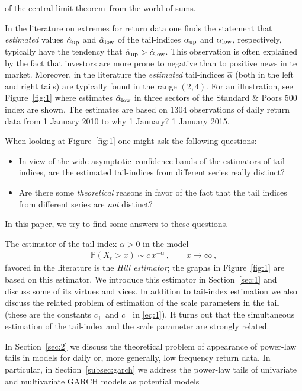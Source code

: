 \documentclass[11pt,a4]{amsart}
\newcommand{\red}{\color{darkred}}
\newcommand{\clt}{central limit theorem}
\newcommand{\asy}{asymptotic}
\newcommand{\fre}{frequenc}
\newcommand{\beao}{\begin{eqnarray*}}
\newcommand{\eeao}{\end{eqnarray*}\noindent}
\newcommand{\xto}{x\to\infty}
\renewcommand{\P }{{\mathbb P}}
\newcommand{\1}{{\mathbf 1}}
\begin{document}
of the \clt\ from the world of sums.
\par
In the literature on extremes for return data one finds the 
statement that {\em estimated} values $\hat \alpha_{\rm up}$ and $\hat \alpha_{\rm low}$ 
of the tail-indices $\alpha_{\rm up}$ and $\alpha_{\rm low}$,
respectively, typically have the tendency that $\hat \alpha_{\rm
  up}>\hat \alpha_{\rm low}$. 
This observation is often explained by the fact that investors are
more prone to negative than to positive news in te market. 
Moreover, in the literature the {\em estimated} tail-indices $\hat \alpha$ (both in the left and right tails) 
are typically found in the range $(2,4)$. For an illustration, see
Figure~\ref{fig:1} where estimates $\hat \alpha_{\rm low}$ 
in three sectors of the Standard \& Poors 500 index  are shown. The
estimates are based on 1304 observations of daily return 
data from 1 January 2010 to {\red why 1 January?} 1 January 2015.
\par
When looking at Figure~\ref{fig:1} one might ask the following questions:
\begin{itemize}
\item
In view of the wide \asy\ confidence bands of the estimators of tail-indices, 
are the estimated tail-indices from different series really distinct?
\item
Are there some {\em theoretical} reasons in favor of the fact that the tail indices from different series are {\em not} 
distinct?
\end{itemize}
In this paper, we try to find some answers to these questions. 
\par
The estimator of the tail-index $\alpha>0$  in the model
\beao
\P(X_t>x)\sim c\,x^{-\alpha}\,,\qquad \xto\,,
\eeao
favored in the literature  is the {\em Hill estimator}; the graphs in 
Figure~\ref{fig:1} are based on this estimator. We introduce this estimator in Section~\ref{sec:1} and discuss 
some of its virtues and vices. In addition to tail-index estimation we also discuss the related problem of
estimation of the scale parameters in the tail (these are the constants $c_+$ and $c_-$ in \eqref{eq:1}). It turns out 
that the simultaneous estimation of the tail-index and the scale parameter are strongly related.
\par
In Section~\ref{sec:2} we discuss the theoretical problem of appearance of power-law tails in models 
for daily or, more generally, low \fre y 
return data. In particular, in Section~\ref{subsec:garch} we address the power-law tails of univariate and multivariate GARCH models as potential models
\end{document}

